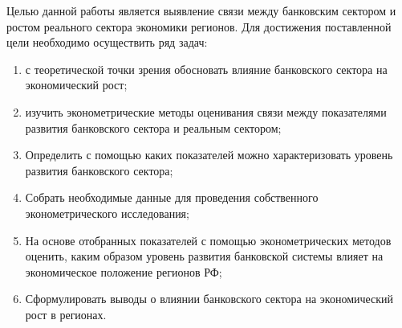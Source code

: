 Целью данной работы является выявление связи между банковским сектором и ростом реального сектора экономики регионов. Для достижения поставленной цели необходимо осуществить ряд задач:
\begin{enumerate}
	\item с теоретической точки зрения обосновать влияние банковского сектора на экономический рост;
	\item изучить эконометрические методы оценивания связи между показателями развития банковского сектора и реальным сектором;
	\item Определить с помощью каких показателей можно характеризовать уровень развития банковского сектора;
	\item Собрать необходимые данные для проведения собственного эконометрического исследования;
	\item	На основе отобранных показателей с помощью эконометрических методов оценить, каким образом уровень развития банковской системы влияет на экономическое положение регионов РФ;
	\item	Сформулировать выводы о влиянии банковского сектора на экономический рост в регионах.
\end{enumerate} 
